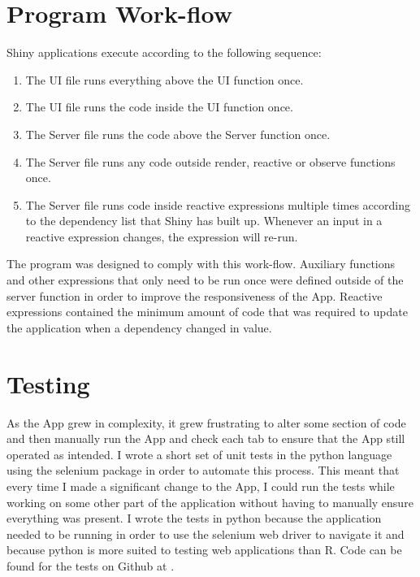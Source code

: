 \section{Program Work-flow}
Shiny applications execute according to the following sequence: 
\begin{enumerate}
	\item The UI file runs everything above the UI function once.
	\item The UI file runs the code inside the UI function once.
	\item The Server file runs the code above the Server function once.
	\item The Server file runs any code outside render, reactive or observe functions once.
	\item The Server file runs code inside reactive expressions multiple times according to the dependency list that Shiny has built up. Whenever an input in a reactive expression changes, the expression will re-run.
\end{enumerate}
The program was designed to comply with this work-flow. Auxiliary functions and other expressions that only need to be run once were defined outside of the server function in order to improve the responsiveness of the App. Reactive expressions contained the minimum amount of code that was required to update the application when a dependency changed in value.

\section{Testing}
As the App grew in complexity, it grew frustrating to alter some section of code and then manually run the App and check each tab to ensure that the App still operated as intended. I wrote a short set of unit tests in the python language using the selenium package in order to automate this process. This meant that every time I made a significant change to the App, I could run the tests while working on some other part of the application without having to manually ensure everything was present. I wrote the tests in python because the application needed to be running in order to use the selenium web driver to navigate it and because python is more suited to testing web applications than R. Code can be found for the tests on Github at \cite{AppTestFiles}.








